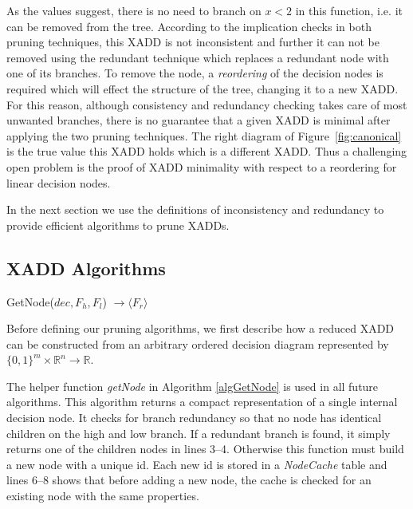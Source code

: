 \documentclass[twoside,11pt]{article}
\begin{document}
As the values suggest, there is no need to branch on $x<2$ in this function, i.e. it can be removed from the tree. According to the implication checks in both pruning techniques, this XADD is not inconsistent and further it can not be removed using the redundant technique which replaces a redundant node with one of its branches. To remove the node, a \emph{reordering} of the decision nodes is required which will effect the structure of the tree, changing it to a new XADD. For this reason, although consistency and redundancy checking takes care of most unwanted branches, there is no guarantee that a given XADD is minimal after applying the two pruning techniques. The right diagram of Figure~\ref{fig:canonical} is the true value this XADD holds which is a different XADD. Thus a challenging open problem is the proof of XADD minimality with respect to a reordering for linear decision nodes. 

In the next section we use the definitions of inconsistency and redundancy to provide efficient algorithms to prune XADDs. 

\subsection{XADD Algorithms}
\label{sec:pruningAlg}
\incmargin{.5em}
\begin{algorithm}[t!]
\dontprintsemicolon
{}
\caption{{\sc GetNode}($\mathit{dec}, F_h, F_l$) $\longrightarrow \langle F_r \rangle$\label{algGetNode}}
\end{algorithm}
\decmargin{.5em}
Before defining our pruning algorithms, we first describe how a reduced XADD can be constructed from an arbitrary ordered decision diagram represented by $\lbrace 0,1 \rbrace^m \times \mathbb{R}^{n} \rightarrow \mathbb{R}$.

The helper function \emph{getNode} in Algorithm \ref{algGetNode} is used in all future algorithms. This algorithm returns a compact representation of a single internal decision node. It checks for branch redundancy so that no node has identical children on the high and low branch. If a redundant branch is found, it simply returns one of the children nodes in lines 3--4. Otherwise this function must build a new node with a unique id. Each new id is stored in a  \emph{NodeCache} table and lines 6--8 shows that before adding a new node, the cache is checked for an existing node with the same properties. 
\end{document}
